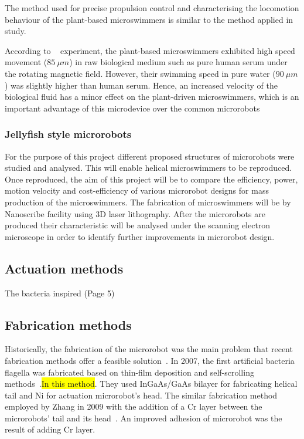 \documentclass[12pt,a4paper,titlepage]{report}
\newcommand{\hilight}[1]{\colorbox{yellow}{#1}}
\begin{document}
The method used for precise propulsion control and characterising the locomotion behaviour of the 
plant-based microswimmers is similar to the method applied in \citeauthor{gao2013bioinspired} study.

According to \citeauthor{gao2013bioinspired} ~\citep{gao2013bioinspired} experiment, the plant-based 
microswimmers exhibited high speed movement ($85~\mu m$) in raw biological medium such as 
pure human serum under the rotating magnetic field. However, their swimming speed in pure water
 ($90~\mu m$) was slightly higher than human serum.   
 Hence, an increased velocity of the 
biological fluid has a minor effect on the plant-driven microswimmers, which is an important 
advantage of this microdevice over the common microrobots%




\subsubsection{Jellyfish style microrobots}
For the purpose of this project different proposed structures of microrobots were studied
 and analysed. This will enable helical microswimmers to be reproduced. Once reproduced, the aim of this project will be to compare
 the efficiency, power, motion velocity and cost-efficiency of various microrobot designs for mass production
 of the microswimmers. The fabrication of microswimmers will be by Nanoscribe facility using 3D laser
 lithography. After the microrobots are produced their characteristic will be analysed
 under the scanning electron microscope in order to identify further improvements in microrobot design. 


\subsection{Actuation methods} \label{actuation}
The bacteria inspired (Page 5)~\citep{peyer2013bio}



\subsection{Fabrication methods} \label{fabrication}

Historically, the fabrication of the microrobot was the main problem that recent fabrication methods 
offer a feasible solution~\citep{gao2013bioinspired}.
In 2007, the first artificial bacteria flagella was fabricated based on thin-film deposition and self-scrolling
 methods~\citep{qiu2014noncytotoxic}.\hilight{In this method}. They used InGaAs/GaAs bilayer for fabricating
helical tail and Ni for actuation microrobot\rq{}s head. The similar fabrication method employed by Zhang
 in 2009 with the addition of a Cr layer between the microrobots\rq{} tail and its head~\citep{qiu2014noncytotoxic}.
An improved adhesion of microrobot was the result of adding Cr layer. 
\end{document}
